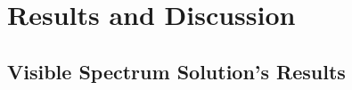 
\chapter{Results and Discussion}
\label{chapter:results}

\section{Visible Spectrum Solution's Results}
\label{section:passiveresults}

